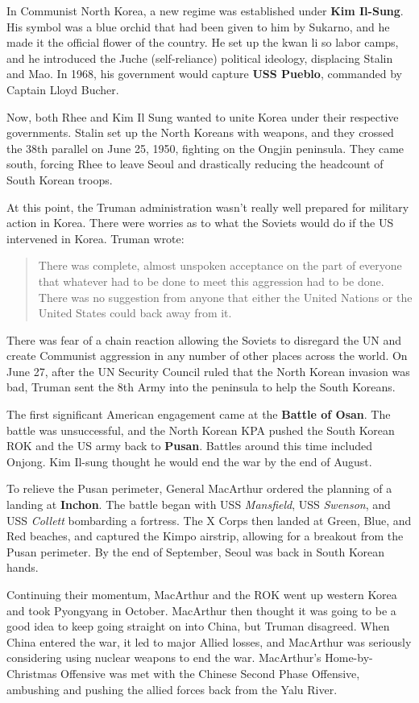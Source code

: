 In Communist North Korea, a new regime was established under \textbf{Kim Il-Sung}.
His symbol was a blue orchid that had been given to him by Sukarno,
and he made it the official flower of the country.
He set up the kwan li so labor camps,
and he introduced the Juche (self-reliance) political ideology, displacing Stalin and Mao.
In 1968, his government would capture \textbf{USS Pueblo}, commanded by Captain Lloyd Bucher.

Now, both Rhee and Kim Il Sung wanted to unite Korea under their respective governments.
Stalin set up the North Koreans with weapons,
and they crossed the 38th parallel on June 25, 1950, fighting on the Ongjin peninsula.
They came south,
forcing Rhee to leave Seoul and drastically reducing the headcount of South Korean troops.

At this point, the Truman administration wasn't really well prepared for military action in Korea.
There were worries as to what the Soviets would do if the US intervened in Korea.
Truman wrote:
\begin{quote}
  There was complete, almost unspoken acceptance
  on the part of everyone that whatever had to be done to meet this aggression had to be done.
  There was no suggestion from anyone that either the United Nations
  or the United States could back away from it.
\end{quote}
There was fear of a chain reaction allowing the Soviets to disregard the UN
and create Communist aggression in any number of other places across the world.
On June 27, after the UN Security Council ruled that the North Korean invasion was bad,
Truman sent the 8th Army into the peninsula to help the South Koreans.

The first significant American engagement came at the \textbf{Battle of Osan}.
The battle was unsuccessful,
and the North Korean KPA pushed the South Korean ROK and the US army back to \textbf{Pusan}.
Battles around this time included Onjong.
Kim Il-sung thought he would end the war by the end of August.

To relieve the Pusan perimeter,
General MacArthur ordered the planning of a landing at \textbf{Inchon}.
The battle began with USS \textit{Mansfield}, USS \textit{Swenson}, and USS \textit{Collett}
bombarding a fortress.
The X Corps then landed at Green, Blue, and Red beaches, and captured the Kimpo airstrip,
allowing for a breakout from the Pusan perimeter.
By the end of September, Seoul was back in South Korean hands.

Continuing their momentum,
MacArthur and the ROK went up western Korea and took Pyongyang in October.
MacArthur then thought it was going to be a good idea to keep going straight on into China,
but Truman disagreed.
When China entered the war, it led to major Allied losses,
and MacArthur was seriously considering using nuclear weapons to end the war.
MacArthur's Home-by-Christmas Offensive was met with the Chinese Second Phase Offensive,
ambushing and pushing the allied forces back from the Yalu River.


